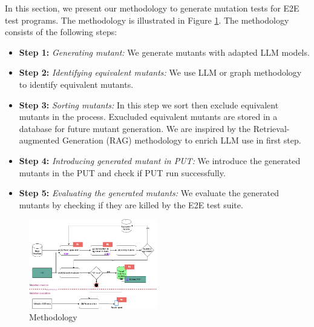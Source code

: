 \label{sec:methodology}

In this section, we present our methodology to generate mutation tests for E2E
test programs. The methodology is illustrated in Figure \ref{fig:methodology}.
The methodology consists of the following steps:

\begin{itemize}
    
\item \textbf{Step 1:} \textit{Generating mutant:} We generate mutants with
adapted LLM models.
    
\item \textbf{Step 2:} \textit{Identifying equivalent mutants:} We use LLM
or graph methodology to identify equivalent mutants.
    
\item \textbf{Step 3:} \textit{Sorting mutants:} In this step we sort then
exclude equivalent mutants in the process. Exucluded equivalent mutants are
stored in a database for future mutant generation. We are inspired by the
Retrieval-augmented Generation (RAG)
methodology  to enrich LLM use in first step.
    
\item \textbf{Step 4:} \textit{Introducing generated mutant in PUT:} We
introduce the generated mutants in the PUT and check if PUT run successfully.

\item \textbf{Step 5:} \textit{Evaluating the generated mutants:} We evaluate
the generated mutants by checking if they are killed by the E2E test suite.
    \end{itemize}

\begin{figure}
  
    \includegraphics[width=0.5\textwidth]{figure/methodology.png}
    \caption{Methodology}
    \label{fig:methodology}
    
\end{figure}